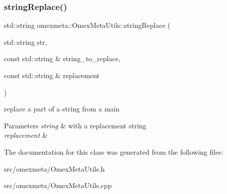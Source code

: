 \subsubsection{\texorpdfstring{string\+Replace()}{stringReplace()}}
{\footnotesize\ttfamily std\+::string omexmeta\+::\+Omex\+Meta\+Utils\+::string\+Replace (\begin{DoxyParamCaption}\item[{std\+::string}]{str,  }\item[{const std\+::string \&}]{string\+\_\+to\+\_\+replace,  }\item[{const std\+::string \&}]{replacement }\end{DoxyParamCaption})\hspace{0.3cm}{\ttfamily [static]}}



replace a part of a string  from a main 


\begin{DoxyParams}{Parameters}
{\em string} & with a replacement string \\
\hline
{\em replacement} & \\
\hline
\end{DoxyParams}


The documentation for this class was generated from the following files\+:\begin{DoxyCompactItemize}
\item 
src/omexmeta/Omex\+Meta\+Utils.\+h\item 
src/omexmeta/Omex\+Meta\+Utils.\+cpp\end{DoxyCompactItemize}
